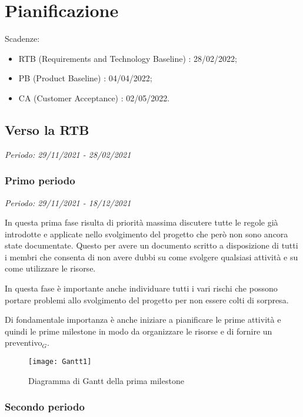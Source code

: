\chapter{Pianificazione}

Scadenze:
\begin{itemize}
    \item RTB (Requirements and Technology Baseline) : 28/02/2022;
    \item PB (Product Baseline) : 04/04/2022;
    \item CA (Customer Acceptance) : 02/05/2022.
\end{itemize}

\section{Verso la RTB}

\textit{Periodo: 29/11/2021 - 28/02/2021}

\subsection{Primo periodo}

\textit{Periodo: 29/11/2021 - 18/12/2021}

In questa prima fase risulta di priorità massima discutere tutte le regole già introdotte
e applicate nello svolgimento del progetto che però non sono ancora state documentate.
Questo per avere un documento scritto a disposizione di tutti i membri che consenta di
non avere dubbi su come svolgere qualsiasi attività e su come utilizzare le risorse.
\par In questa fase è importante anche individuare tutti i vari rischi che possono portare
problemi allo svolgimento del progetto per non essere colti di sorpresa.
\par Di fondamentale importanza è anche iniziare a pianificare le prime attività e quindi
le prime milestone in modo da organizzare le risorse e di fornire un preventivo$_G$. 

\begin{figure}[!ht]
    \texttt{[image: Gantt1]}
    \caption{Diagramma di Gantt della prima milestone} 
\end{figure}

\newpage

\subsection{Secondo periodo}

